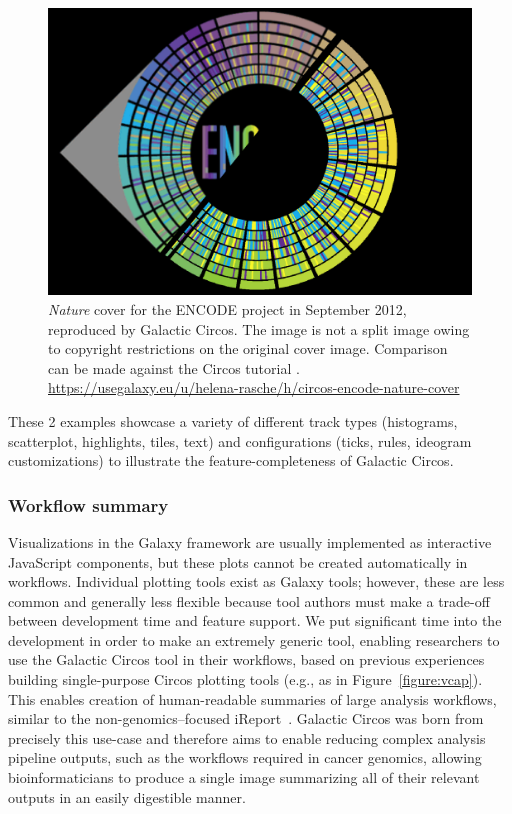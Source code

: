 \begin{figure}[h!]
\centering
\includegraphics[width=0.7\linewidth]{chapters/images/circos/plot-encode-both.png}
\caption{\emph{Nature} cover for the ENCODE project in September 2012, reproduced by Galactic Circos. The image is not a split image owing to copyright restrictions on the original cover image. Comparison can be made against the Circos tutorial \cite{circos-nature-example}. \url{https://usegalaxy.eu/u/helena-rasche/h/circos-encode-nature-cover}}\label{figure:encode}
\end{figure}

These 2 examples showcase a variety of different track types (histograms, scatterplot, highlights, tiles, text) and configurations (ticks, rules, ideogram customizations) to illustrate the feature-completeness of Galactic Circos. %

\subsubsection{Workflow summary}
Visualizations in the Galaxy framework are usually implemented as interactive JavaScript components, but these plots cannot be created automatically in workflows.
Individual plotting tools exist as Galaxy tools; however, these are less common and generally less flexible because tool authors must make a trade-off between development time and feature support.
We put significant time into the development in order to make an extremely generic tool, enabling researchers to use the Galactic Circos tool in their workflows, based on previous experiences building single-purpose Circos plotting tools (e.g., as in Figure~\ref{figure:vcap}).
This enables creation of human-readable summaries of large analysis workflows, similar to the non-genomics–focused iReport~\cite{hiltemann2014ireport}. Galactic Circos was born from precisely this use-case and therefore aims to enable reducing complex analysis pipeline outputs, such as the workflows required in cancer genomics, allowing bioinformaticians to produce a single image summarizing all of their relevant outputs in an easily digestible manner.


